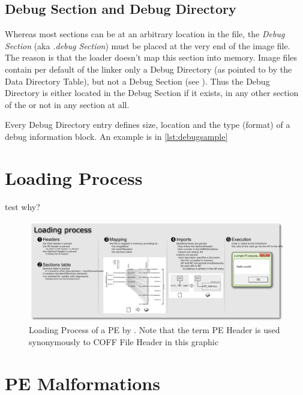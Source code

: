 \subsection*{Debug Section and Debug Directory}

Whereas most sections can be at an arbitrary location in the file, the \emph{Debug Section} (aka \emph{.debug Section}) must be placed at the very end of the image file. The reason is that the loader doesn't map this section into memory. Image files contain per default of the linker only a Debug Directory (as pointed to by the Data Directory Table), but not a Debug Section (see \cite[]{pespec}). Thus the Debug Directory is either located in the Debug Section if it exists, in any other section of the \PE{} or not in any section at all.

Every Debug Directory entry defines \ia{} size, location and the type (format) of a debug information block. An example is in \autoref{lst:debugsample}



\section{Loading Process}

test \cite{peloading} why?

\begin{figure}
\includegraphics[height=.39\textheight,keepaspectratio]{graphics/pe101}
\caption{ Loading Process of a PE by . Note that the term PE Header is used synonymously to COFF File Header in this graphic}
\label{fig:loading} 
\end{figure}


\section{PE Malformations}

